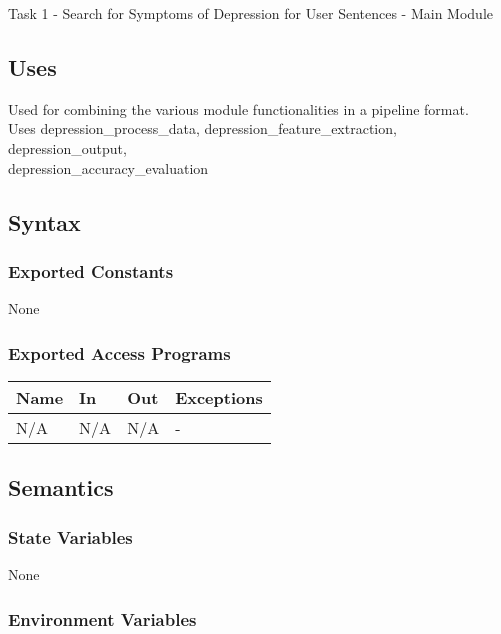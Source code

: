 \documentclass[12pt, titlepage]{article}
\begin{document}
Task 1 - Search for Symptoms of Depression for User Sentences - Main Module


\subsection{Uses}

Used for combining the various module functionalities in a pipeline format.\\ 
Uses depression\_process\_data, depression\_feature\_extraction, depression\_output, \\ 
depression\_accuracy\_evaluation

\subsection{Syntax}

\subsubsection{Exported Constants}

None 


\subsubsection{Exported Access Programs}

\begin{center}

\begin{tabular}{p{3cm}p{2cm}p{2cm}p{4cm}}
\hline
\textbf{Name} & \textbf{In} & \textbf{Out} & \textbf{Exceptions} \\
\hline
N/A & N/A & N/A & - \\
\end{tabular}
\end{center}

\subsection{Semantics}

\subsubsection{State Variables}

None

\subsubsection{Environment Variables}
\end{document}
